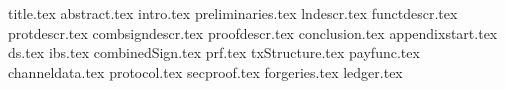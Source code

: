 \documentclass[11pt]{llncs}
\begin{document}
\pagestyle{plain}
{title.tex}
{abstract.tex}
{intro.tex}
{preliminaries.tex}
{lndescr.tex}
{functdescr.tex}
{protdescr.tex}
{combsigndescr.tex}
{proofdescr.tex}
{conclusion.tex}
{appendixstart.tex}
{ds.tex}
{ibs.tex}
{combinedSign.tex}
{prf.tex}
{txStructure.tex}
{payfunc.tex}
{channeldata.tex}
{protocol.tex}
{secproof.tex}
{forgeries.tex}
{ledger.tex}


\end{document}
